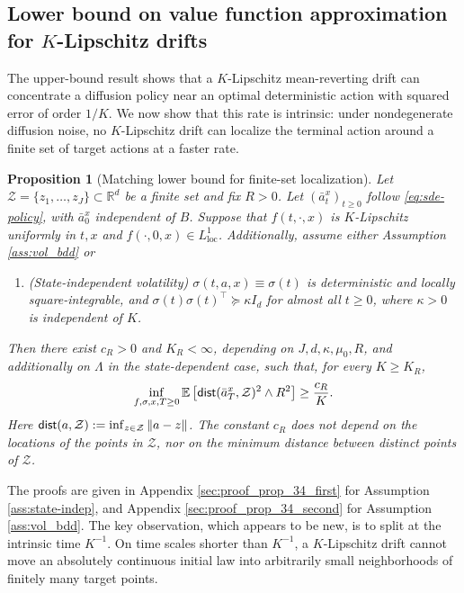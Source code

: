 \documentclass{article}
\newtheorem{prop}[thm]{Proposition}
\newcommand{\1}{\mathbbm{1}}
\newcommand{\dist}{{\sf dist}}
\numberwithin{equation}{section}
\begin{document}
\subsection{Lower bound on value function approximation for $K$-Lipschitz drifts}\label{subsec:lb_vfa}
The upper-bound result shows that a \(K\)-Lipschitz mean-reverting drift can concentrate a diffusion policy near an optimal deterministic action with squared error of order \(1/K\). 
We now show that this rate is intrinsic: under nondegenerate diffusion noise, no \(K\)-Lipschitz drift can localize the terminal action around a finite set of target actions at a faster rate.
\begin{prop}[Matching lower bound for finite-set localization]
\label{prop:lb_diffusion}
Let \(\mathcal Z=\{z_1,\ldots,z_J\}\subset\mathbb R^d\) be a finite set and fix \(R>0\).  Let
$(\bar a^x_t)_{t\ge0}$ follow \eqref{eq:sde-policy}, with $\bar a^x_0$ independent of $B$. Suppose that
$f(t,\cdot,x)$ is $K$-Lipschitz uniformly in $t,x$ and $f(\cdot, 0,x)\in L^{1}_{\text{loc}}$. Additionally, assume either Assumption \ref{ass:vol_bdd} or
\begin{enumerate}
\item[(A2)]\makeatletter {} \makeatother \label{ass:state-indep} (State-independent volatility) $\sigma(t, a,x)\equiv \sigma(t)$ is
  deterministic and locally square-integrable, and
$\sigma(t)\sigma(t)^\top\succeq \kappa I_d$ for almost all $t\ge0$, where $\kappa>0$ is independent of $K$.
\end{enumerate}

Then there exist $c_R>0$ and $K_R<\infty$, depending on
$J,d,\kappa,\mu_0,R$, and additionally on \(\Lambda\) in the state-dependent
case, such that, for every \(K\ge K_R\),
$$
\inf_{f,\sigma,x,T\ge0}
\mathbb E\left[\dist(\bar a^x_T,\mathcal{Z})^2\wedge R^2\right]
\ge
\frac{c_R}{K}.
$$
Here $\dist(a,\mathcal Z):=\inf_{z\in\mathcal Z}\|a-z\|$. The constant $c_R$ does not depend on the locations of the points in $\mathcal{Z}$, nor
on the minimum distance between distinct points of $\mathcal{Z}$.
\end{prop}
The proofs are given in Appendix \ref{sec:proof_prop_34_first} for Assumption \ref{ass:state-indep}, and Appendix \ref{sec:proof_prop_34_second} for Assumption \ref{ass:vol_bdd}. The key observation, which appears to be new, is to split at the intrinsic time \(K^{-1}\). On time scales shorter than \(K^{-1}\), a \(K\)-Lipschitz drift cannot move an absolutely continuous initial law into arbitrarily small neighborhoods of finitely many target points. 
\end{document}
